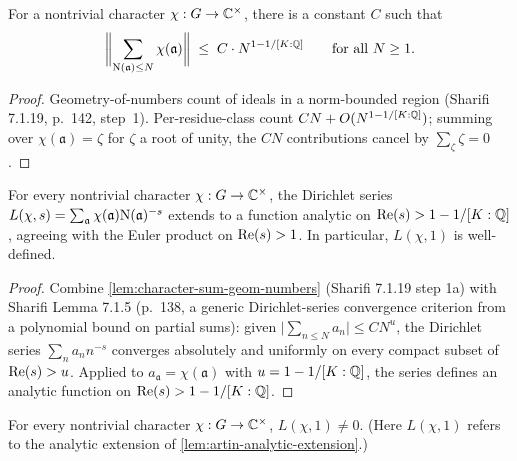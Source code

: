 \begin{lemma}\label{lem:character-sum-geom-numbers}
  For a nontrivial character $\chi: G \to \mathbb{C}^\times$, there is a
  constant $C$ such that
  \[
    \biggl\lVert\sum_{\mathrm{N}(\mathfrak{a})\le N}\chi(\mathfrak{a})\biggr\rVert
    \;\le\; C \cdot N^{1 - 1/[K:\mathbb{Q}]} \qquad\text{for all }N\ge 1.
  \]
\end{lemma}

\begin{proof}
  Geometry-of-numbers count of ideals in a norm-bounded region
  (Sharifi 7.1.19, p.~142, step~1). Per-residue-class count
  $C N + O(N^{1-1/[K:\mathbb{Q}]})$; summing over $\chi(\mathfrak{a}) = \zeta$
  for $\zeta$ a root of unity, the $C N$ contributions cancel by
  $\sum_\zeta \zeta = 0$.
\end{proof}

\begin{lemma}\label{lem:artin-analytic-extension}
  For every nontrivial character $\chi: G \to \mathbb{C}^\times$, the
  Dirichlet series
  $L(\chi, s) = \sum_{\mathfrak{a}} \chi(\mathfrak{a})\mathrm{N}(\mathfrak{a})^{-s}$
  extends to a function analytic on $\operatorname{Re}(s) > 1 - 1/[K:\mathbb{Q}]$, agreeing
  with the Euler product on $\operatorname{Re}(s) > 1$. In particular, $L(\chi, 1)$
  is well-defined.
\end{lemma}

\begin{proof}
  Combine \cref{lem:character-sum-geom-numbers} (Sharifi 7.1.19 step 1a)
  with Sharifi Lemma 7.1.5 (p.~138, a generic Dirichlet-series
  convergence criterion from a polynomial bound on partial sums):
  given $\bigl|\sum_{n\le N}a_n\bigr|\le CN^{u}$, the Dirichlet series
  $\sum_n a_n n^{-s}$ converges absolutely and uniformly on every
  compact subset of $\operatorname{Re}(s) > u$. Applied to
  $a_{\mathfrak{a}} = \chi(\mathfrak{a})$ with $u = 1 - 1/[K:\mathbb{Q}]$, the
  series defines an analytic function on
  $\operatorname{Re}(s) > 1 - 1/[K:\mathbb{Q}]$.
\end{proof}

\begin{lemma}\label{lem:artin-one-ne-zero}
  For every nontrivial character $\chi: G \to \mathbb{C}^\times$,
  $L(\chi, 1) \ne 0$. (Here $L(\chi, 1)$ refers to the analytic
  extension of \cref{lem:artin-analytic-extension}.)
\end{lemma}

